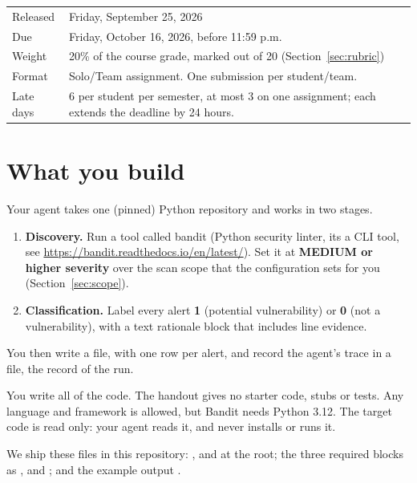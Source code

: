 \documentclass[9pt,letterpaper]{article}
\begin{document}
\begin{center}
\begin{tabularx}{\linewidth}{@{}lX@{}}
\toprule
Released & Friday, September 25, 2026 \\
Due & Friday, October 16, 2026, before 11:59 p.m. \\
Weight & 20\% of the course grade, marked out of 20 (Section~\ref{sec:rubric}) \\
Format & Solo/Team assignment. One submission per student/team. \\
Late days & 6 per student per semester, at most 3 on one assignment; each extends the deadline by 24 hours. \\
\bottomrule
\end{tabularx}
\end{center}

\section{What you build}

Your agent takes one (pinned) Python repository and works in two stages.
\begin{enumerate}

  \item \textbf{Discovery.} Run a tool called bandit (Python security linter, its a CLI tool, see \url{https://bandit.readthedocs.io/en/latest/}).
Set it at \textbf{MEDIUM or higher severity} over the scan scope that the configuration sets for you (Section~\ref{sec:scope}).

\item \textbf{Classification.} Label every alert \textbf{1} (potential vulnerability)
  or \textbf{0} (not a vulnerability), with a text rationale block that includes line evidence.
\end{enumerate}

You then write a  file, with one row per alert, and record the agent's trace in a  file, the record of the run.

You write all of the code. The handout gives no starter code, stubs or tests.
Any language and framework is allowed, but Bandit needs Python 3.12. The target
code is read only: your agent reads it, and never installs or runs it.

We ship these files in this repository: ,
 and  at the root; the three
required \code{[scan]} blocks as ,
 and ;
and the example output .
\end{document}
